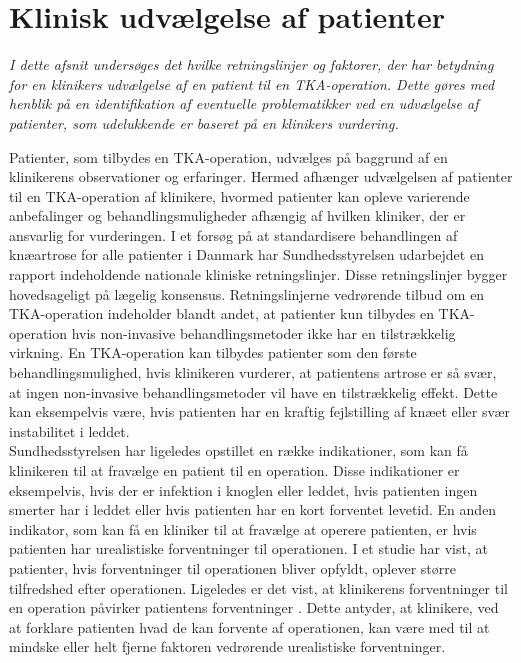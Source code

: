 \section{Klinisk udvælgelse af patienter}\label{kliniskudvaelgelse}
\textit{I dette afsnit undersøges det hvilke retningslinjer og faktorer, der har betydning for en klinikers udvælgelse af en patient til en TKA-operation. Dette gøres med henblik på en identifikation af eventuelle problematikker ved en udvælgelse af patienter, som udelukkende er baseret på en klinikers vurdering.}

Patienter, som tilbydes en TKA-operation, udvælges på baggrund af en klinikerens observationer og erfaringer. Hermed afhænger udvælgelsen af patienter til en TKA-operation af klinikere, hvormed patienter kan opleve varierende anbefalinger og behandlingsmuligheder afhængig af hvilken kliniker, der er ansvarlig for vurderingen.  I et forsøg på at standardisere behandlingen af knæartrose for alle patienter i Danmark har Sundhedsstyrelsen udarbejdet en rapport indeholdende nationale kliniske retningslinjer. Disse retningslinjer bygger hovedsageligt på lægelig konsensus. Retningslinjerne vedrørende tilbud om en TKA-operation indeholder blandt andet, at patienter kun tilbydes en TKA-operation hvis non-invasive behandlingsmetoder ikke har en tilstrækkelig virkning. En TKA-operation kan tilbydes patienter som den første behandlingsmulighed, hvis klinikeren vurderer, at patientens artrose er så svær, at ingen non-invasive behandlingsmetoder vil have en tilstrækkelig effekt. Dette kan eksempelvis være, hvis patienten har en kraftig fejlstilling af knæet eller svær instabilitet i leddet. \citep{brostrom2012} \\
Sundhedsstyrelsen har ligeledes opstillet en række indikationer, som kan få klinikeren til at fravælge en patient til en operation. Disse indikationer er eksempelvis, hvis der er infektion i knoglen eller leddet, hvis patienten ingen smerter har i leddet eller hvis patienten har en kort forventet levetid. En anden indikator, som kan få en kliniker til at fravælge at operere patienten, er hvis patienten har urealistiske forventninger til operationen. \citep{brostrom2012} I et studie har  vist, at patienter, hvis forventninger til operationen bliver opfyldt, oplever større tilfredshed efter operationen. Ligeledes er det vist, at klinikerens forventninger til en operation påvirker patientens forventninger \citep{tejada2010}. Dette antyder, at klinikere, ved at forklare patienten hvad de kan forvente af operationen, kan være med til at mindske eller helt fjerne faktoren vedrørende urealistiske forventninger. \\

